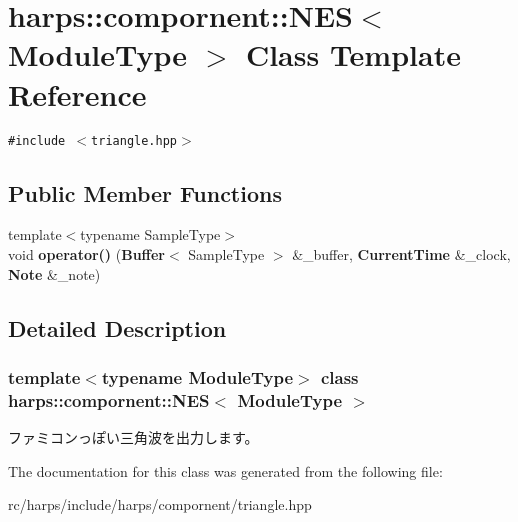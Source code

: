 \section{harps::compornent::NES$<$ ModuleType $>$ Class Template Reference}
\label{classharps_1_1compornent_1_1NES}
{\tt \#include $<$triangle.hpp$>$}

\subsection*{Public Member Functions}
\begin{CompactItemize}
\item 
{\footnotesize template$<$typename SampleType$>$ }\\void \textbf{operator()} ({\bf Buffer}$<$ SampleType $>$ \&\_\-buffer, {\bf CurrentTime} \&\_\-clock, {\bf Note} \&\_\-note)\label{classharps_1_1compornent_1_1NES_33a4c1c50b22d100ce08925a616058e6}

\end{CompactItemize}


\subsection{Detailed Description}
\subsubsection*{template$<$typename ModuleType$>$ class harps::compornent::NES$<$ ModuleType $>$}

ファミコンっぽい三角波を出力します。 

The documentation for this class was generated from the following file:\begin{CompactItemize}
\item 
rc/harps/include/harps/compornent/triangle.hpp\end{CompactItemize}
